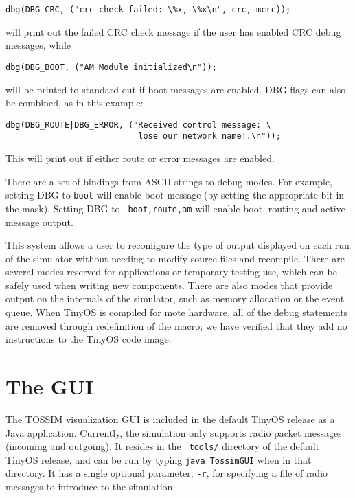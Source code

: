 \documentclass[12pt]{article}
\begin{document}
\begin{verbatim}
dbg(DBG_CRC, ("crc check failed: \%x, \%x\n", crc, mcrc));
\end{verbatim}


will print out the failed CRC check message if the user has enabled
CRC debug messages, while


\begin{verbatim}
dbg(DBG_BOOT, ("AM Module initialized\n"));
\end{verbatim}


will be printed to standard out if boot messages are enabled. DBG
flags can also be combined, as in this example:


\begin{verbatim}
dbg(DBG_ROUTE|DBG_ERROR, ("Received control message: \
                           lose our network name!.\n"));
\end{verbatim}


This will print out if either route or error messages are enabled.

There are a set of bindings from ASCII strings to debug modes. For
example, setting DBG to {\tt boot} will enable boot message (by
setting the appropriate bit in the mask). Setting DBG to {\tt
boot,route,am} will enable boot, routing and active message output.

This system allows a user to reconfigure the type of output displayed
on each run of the simulator without needing to modify source files
and recompile. There are several modes reserved for applications or
temporary testing use, which can be safely used when writing new
components. There are also modes that provide output on the internals
of the simulator, such as memory allocation or the event queue. When
TinyOS is compiled for mote hardware, all of the debug statements are
removed through redefinition of the macro; we have verified that they
add no instructions to the TinyOS code image.


\section*{The GUI}

The TOSSIM visualization GUI is included in the default TinyOS release
as a Java application. Currently, the simulation only supports radio
packet messages (incoming and outgoing). It resides in the {\tt
tools/} directory of the default TinyOS release, and can be run by
typing {\tt java TossimGUI} when in that directory. It has a single
optional parameter, {\tt -r}, for specifying a file of radio messages
to introduce to the simulation.
\end{document}
